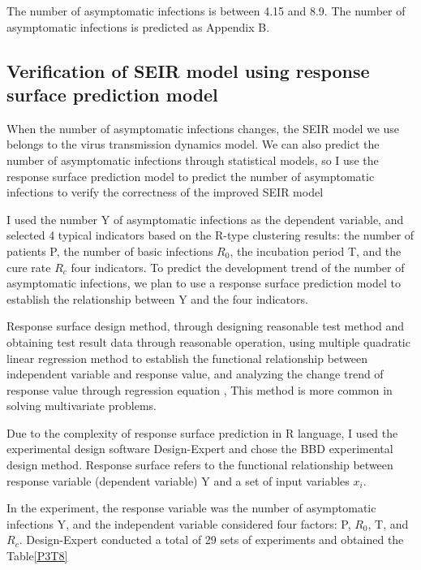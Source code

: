 \documentclass[a4paper, 11pt,twoside=true]{scrartcl}
\begin{document}
\quad The number of asymptomatic infections is between 4.15 and 8.9. The number of asymptomatic infections is predicted as Appendix B.

\subsection{Verification of SEIR model using response surface prediction model}
\qquad When the number of asymptomatic infections changes, the SEIR model we use belongs to the virus transmission dynamics model. We can also predict the number of asymptomatic infections through statistical models, so I use the response surface prediction model to predict the number of asymptomatic infections to verify the correctness of the improved SEIR model

\quad I used the number Y of asymptomatic infections as the dependent variable, and selected 4 typical indicators based on the R-type clustering results: the number of patients P, the number of basic infections $R_0$, the incubation period T, and the cure rate $R_c$ four indicators. To predict the development trend of the number of asymptomatic infections, we plan to use a response surface prediction model to establish the relationship between Y and the four indicators.

\quad Response surface design method, through designing reasonable test method and obtaining test result data through reasonable operation, using multiple quadratic linear regression method to establish the functional relationship between independent variable and response value, and analyzing the change trend of response value through regression equation , This method is more common in solving multivariate problems.

\quad Due to the complexity of response surface prediction in R language, I used the experimental design software Design-Expert and chose the BBD experimental design method. Response surface refers to the functional relationship between response variable (dependent variable) Y and a set of input variables $x_i$.

\quad In the experiment, the response variable was the number of asymptomatic infections Y, and the independent variable considered four factors: P, $R_0$, T, and $R_c$. Design-Expert conducted a total of 29 sets of experiments and obtained the Table\ref{P3T8}
\end{document}

